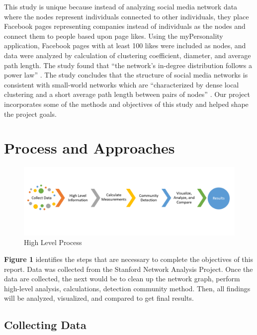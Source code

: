 \documentclass[11pt,twocolumn]{article}
\begin{document}
This study is unique because instead of analyzing social media network data where the nodes represent individuals connected to other individuals, they place Facebook pages representing companies instead of individuals as the nodes and connect them to people based upon page likes. Using the myPersonality application, Facebook pages with at least 100 likes were included as nodes, and data were analyzed by calculation of clustering coefficient, diameter, and average path length. The study found that “the network’s in-degree distribution follows a power law” \cite{page-likes-facebook}. The study concludes that the structure of social media networks is consistent with small-world networks which are “characterized by dense local clustering and a short average path length between pairs of nodes” \cite{page-likes-facebook}. Our project incorporates some of the methods and objectives of this study and helped shape the project goals.

\section{Process and Approaches}

\begin{figure}[hbt!]
\includegraphics[scale=0.2]{process_flow.PNG} 
\caption{High Level Process}
\end{figure}

\textbf{Figure 1} identifies the steps that are necessary to complete the objectives of this report. Data was collected from the Stanford Network Analysis Project. Once the data are collected, the next would be to clean up the network graph, perform high-level analysis, calculations, detection community method. Then, all findings will be analyzed, visualized, and compared to get final results.

\subsection{Collecting Data}
\end{document}
